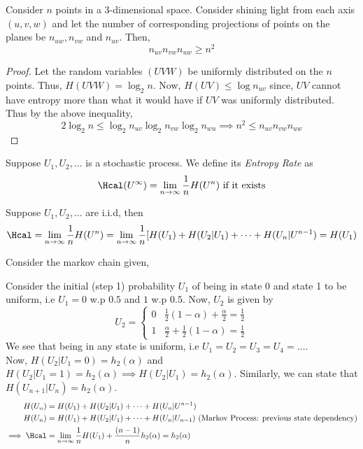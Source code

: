 \begin{theorem}
Consider $n$ points in a 3-dimensional space. Consider shining light from each axis $(u,v,w)$ and let the number of corresponding projections of points on the planes be $n_{uw}, n_{vw}$ and $n_{uv}$. Then,
\[ n_{uv} n_{vw} n_{uw} \geq n^2 \]
\end{theorem}
\begin{proof}
Let the random variables $(UVW)$ be uniformly distributed on the $n$ points. Thus, $H(UVW) = \log_2n$. Now, $H(UV) \leq \log n_{uv}$ since, $UV$ cannot have entropy more than what it would have if $UV$ was uniformly distributed. Thus by the above inequality,
\[2\log_2 n \leq \log_2 n_{uv} \log_2 n_{vw} \log_2 n_{wu} \implies n^2 \leq n_{uv} n_{vw} n_{uw}\]
\end{proof}
\begin{definition}
Suppose $U_1, U_2, \dots$ is a stochastic process. We define its \textit{Entropy Rate} as
\[ \Hcal(U^\infty) = \lim_{n\to\infty} \frac{1}{n}H(U^n) \text{ if it exists}\]
\end{definition}
\begin{eg}
Suppose $U_1, U_2, \dots$ are i.i.d, then 
\[ \Hcal = \lim_{n\to\infty} \frac{1}{n} H(U^n) = \lim_{n\to\infty} \frac{1}{n} [H(U_1) + H(U_2|U_1) + \cdots + H(U_n|U^{n-1}) = H(U_1)\]
\end{eg}
\begin{eg}
Consider the markov chain given, 
    \begin{center}
    \end{center}
Consider the initial (step 1) probability $U_1$ of being in state 0 and state 1 to be uniform, i.e $U_1 = 0$ w.p $0.5$ and $1$ w.p $0.5$. Now, $U_2$ is given by
\[
U_2 = \begin{cases}
0 & \frac{1}{2} (1-\alpha) + \frac{\alpha}{2} = \frac{1}{2} \\
1 & \frac{\alpha}{2} + \frac{1}{2}(1-\alpha) = \frac{1}{2}
\end{cases}
\]
We see that being in any state is uniform, i.e $U_1 = U_2 = U_3 = U_4 = \dots$. \\Now, $H(U_2 | U_1 = 0) = h_2(\alpha)$ and $H(U_2|U_1 = 1) = h_2(\alpha) \implies H(U_2|U_1) = h_2(\alpha)$. Similarly, we can state that $H(U_{n+1} | U_n) = h_2(\alpha)$.
\begin{align*} 
H(U_n) &= H(U_1) + H(U_2|U_1) + \cdots + H(U_n|U^{n-1}) \\
H(U_n) &= H(U_1) + H(U_2|U_1) + \cdots + H(U_n|U_{n-1}) \text { (Markov Process: previous state dependency)} \\
\implies \Hcal &= \lim_{n\to\infty} \frac{1}{n} H(U_1) + \frac{(n-1)}{n} h_2(\alpha) = h_2(\alpha)
\end{align*}
\end{eg}